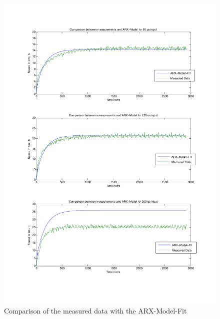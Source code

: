 \documentclass[twoside]{article}
\begin{document}
\begin{figure}[h!]
\begin{minipage}{0.5\textwidth}
\centering
\includegraphics[scale=0.4]{comparison1.pdf}
\caption{Comparison of the measured data with the ARX-Model-Fit}
\end{minipage}
\begin{minipage}{0.5\textwidth}
\centering

\end{minipage}
\end{figure}
\end{document}
